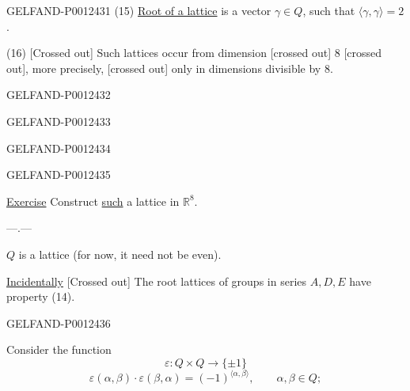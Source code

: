 \begin{GelfandAdjacentEvidence}{GELFAND-P001243}{1}
(15) \underline{Root of a lattice} is a vector $\gamma\in Q$, such that $\langle\gamma,\gamma\rangle=2$.

(16) [Crossed out] Such lattices occur from dimension [crossed out] $8$ [crossed out], more precisely,
[crossed out] only in dimensions divisible by $8$.
\end{GelfandAdjacentEvidence}
\begin{GelfandAdjacentEvidence}{GELFAND-P001243}{2}

\end{GelfandAdjacentEvidence}
\begin{GelfandAdjacentEvidence}{GELFAND-P001243}{3}

\end{GelfandAdjacentEvidence}
\begin{GelfandAdjacentEvidence}{GELFAND-P001243}{4}

\end{GelfandAdjacentEvidence}
\begin{GelfandAdjacentEvidence}{GELFAND-P001243}{5}


\underline{Exercise} Construct \underline{such} a lattice in $\mathbb R^8$.

\begin{center}—\quad .\quad —\end{center}

$Q$ is a lattice (for now, it need not be even).

\underline{Incidentally} [Crossed out] The root lattices of groups in series $A,D,E$ have property (14).
\end{GelfandAdjacentEvidence}
\begin{GelfandAdjacentEvidence}{GELFAND-P001243}{6}


Consider the function
\begin{equation*}
\varepsilon:Q\times Q\longrightarrow\{\pm1\}\tag{17}
\end{equation*}
\begin{equation*}
\varepsilon(\alpha,\beta)\cdot\varepsilon(\beta,\alpha)=(-1)^{\langle\alpha,\beta\rangle},
\qquad\alpha,\beta\in Q;\tag{18}
\end{equation*}
\end{GelfandAdjacentEvidence}
